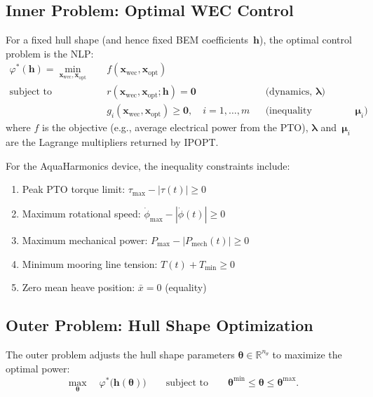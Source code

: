 \documentclass[11pt,a4paper]{article}
\newcommand{\R}{\mathbb{R}}
\newcommand{\vp}{\varphi}
\newcommand{\xwec}{\bm{x}_{\mathrm{wec}}}
\newcommand{\xopt}{\bm{x}_{\mathrm{opt}}}
\newcommand{\bh}{\bm{h}}
\newcommand{\blam}{\bm{\lambda}}
\newcommand{\bmu}{\bm{\mu}}
\newcommand{\btheta}{\bm{\theta}}
\begin{document}
\subsection{Inner Problem: Optimal WEC Control}

For a fixed hull shape (and hence fixed BEM coefficients~$\bh$), the
optimal control problem is the NLP:
\begin{equation}
\label{eq:inner}
\boxed{
\begin{aligned}
    \vp^*(\bh) = \min_{\xwec, \xopt} \quad
        & f(\xwec, \xopt) \\
    \text{subject to} \quad
        & r(\xwec, \xopt; \bh) = \bm{0}
            && \text{(dynamics, } \blam \text{)} \\
        & g_i(\xwec, \xopt) \ge \bm{0}, \quad i=1,\ldots,m
            && \text{(inequality constraints, } \bmu_i \text{)}
\end{aligned}
}
\end{equation}
where $f$ is the objective (e.g., average electrical power from the PTO),
$\blam$ and~$\bmu_i$ are the Lagrange multipliers returned by IPOPT.

For the AquaHarmonics device, the inequality constraints include:
\begin{enumerate}
    \item Peak PTO torque limit: $\tau_{\max} - |\tau(t)| \ge 0$
    \item Maximum rotational speed: $\dot{\phi}_{\max} - |\dot{\phi}(t)| \ge 0$
    \item Maximum mechanical power: $P_{\max} - |P_{\mathrm{mech}}(t)| \ge 0$
    \item Minimum mooring line tension: $T(t) + T_{\min} \ge 0$
    \item Zero mean heave position: $\bar{x} = 0$ (equality)
\end{enumerate}

\subsection{Outer Problem: Hull Shape Optimization}

The outer problem adjusts the hull shape parameters
$\btheta \in \R^{n_\theta}$ to maximize the optimal power:
\begin{equation}
\label{eq:outer}
    \max_{\btheta} \quad \vp^*\bigl(\bh(\btheta)\bigr)
    \qquad \text{subject to} \qquad
    \btheta^{\min} \le \btheta \le \btheta^{\max}.
\end{equation}
\end{document}
